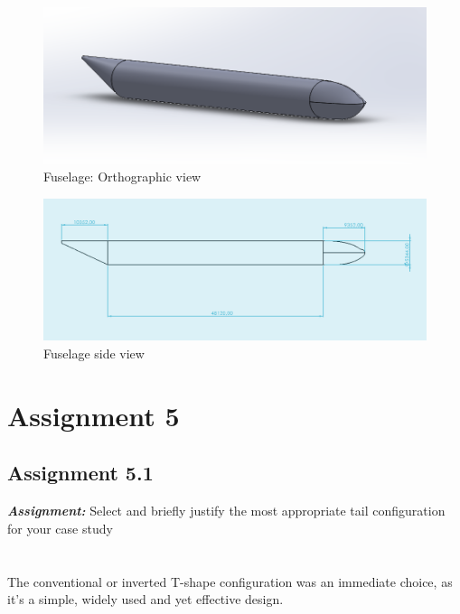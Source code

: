 \documentclass{article}
\begin{document}
\begin{figure}[h!]
    \centering
    \includegraphics[width=\textwidth]{Sources/Plots_and_Pictures/fuselage_CAD.png}
    \caption{Fuselage: Orthographic view}
    \label{fuselage_cad_3D}
\end{figure}

\begin{figure}[h!]
    \centering
    \includegraphics[width=\textwidth]{Sources/Plots_and_Pictures/fuselage_pianta.png}
    \caption{Fuselage side view}
    \label{fuselage_cad_3D}
\end{figure}


\clearpage

\section{Assignment 5\label{Assignment_5}}

\subsection{Assignment 5.1\label{Assignment_5.1}}

\textbf{\textit{Assignment:}} Select and briefly justify the most appropriate
 tail configuration for your case study \\ \\ \\ 

The conventional or inverted T-shape configuration was an immediate choice, as it's a simple, widely
used and yet effective design. 
\end{document}
